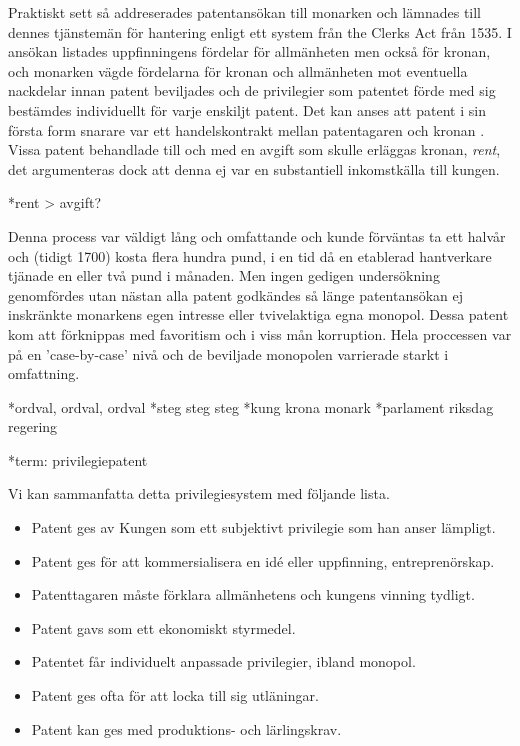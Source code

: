 Praktiskt sett så addreserades patentansökan till monarken och lämnades till dennes tjänstemän för hantering enligt ett
system från the Clerks Act från 1535\cite{bracha}. I ansökan listades uppfinningens fördelar för allmänheten men också
för kronan, och monarken vägde fördelarna för kronan och allmänheten mot eventuella nackdelar innan patent
beviljades och de privilegier som patentet förde med sig bestämdes individuellt för varje enskiljt patent. Det kan anses att patent i sin första form snarare var ett handelskontrakt mellan patentagaren och kronan
\cite{bracha}. Vissa patent behandlade till och med en avgift som skulle erläggas kronan, \emph{rent},
det argumenteras dock att denna ej var en substantiell inkomstkälla till kungen. \cite{macleod2}

*rent > avgift?

Denna process var väldigt lång och omfattande och kunde
förväntas ta ett halvår och (tidigt 1700) kosta flera hundra pund, i en tid då en etablerad hantverkare tjänade en eller två pund i månaden. \cite{macleod}
Men ingen gedigen undersökning genomfördes utan nästan alla patent godkändes så
länge patentansökan ej inskränkte monarkens egen intresse eller tvivelaktiga egna monopol. 
Dessa patent kom att förknippas med favoritism och i viss mån korruption. Hela proccessen var på en
'case-by-case' nivå och de beviljade monopolen varrierade starkt i omfattning\cite{bracha}.

*ordval, ordval, ordval
*steg steg steg
*kung krona monark
*parlament riksdag regering

*term: privilegiepatent

Vi kan sammanfatta detta privilegiesystem med följande lista.
\begin{itemize}
	\item Patent ges av Kungen som ett subjektivt privilegie som han anser lämpligt.
	\item Patent ges för att kommersialisera en idé eller uppfinning, entreprenörskap.
	\item Patenttagaren måste förklara allmänhetens och kungens vinning tydligt.
	\item Patent gavs som ett ekonomiskt styrmedel.
	\item Patentet får individuelt anpassade privilegier, ibland monopol.
	\item Patent ges ofta för att locka till sig utläningar.
	\item Patent kan ges med produktions- och lärlingskrav.
\end{itemize}

